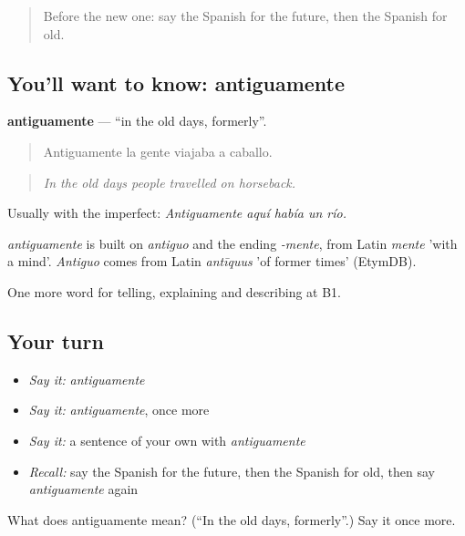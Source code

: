 \label{lesson:ES-C575-antiguamente}



\begin{quote}
Before the new one: say the Spanish for the future, then the Spanish for old.
\end{quote}

\subsection*{You'll want to know: antiguamente}
\textbf{antiguamente} — \textquotedblleft{}in the old days, formerly\textquotedblright{}.

\begin{quote}
Antiguamente la gente viajaba a caballo.
\end{quote}

\begin{quote}
\emph{In the old days people travelled on horseback.}
\end{quote}

Usually with the imperfect: \emph{Antiguamente aquí había un río.}

\begin{cousinweb}
\emph{antiguamente} is built on \emph{antiguo} and the ending \emph{-mente}, from Latin \emph{mente} 'with a mind'. \emph{Antiguo} comes from Latin \emph{antīquus} 'of former times' (EtymDB).
\end{cousinweb}

\begin{grammarlens}[title={What you've built}]
One more word for telling, explaining and describing at B1.
\end{grammarlens}

\subsection*{Your turn}
\begin{itemize}
\raggedright
  \item \emph{Say it:} \emph{antiguamente}
  \item \emph{Say it:} \emph{antiguamente}, once more
  \item \emph{Say it:} a sentence of your own with \emph{antiguamente}
  \item \emph{Recall:} say the Spanish for the future, then the Spanish for old, then say \emph{antiguamente} again
\end{itemize}

\begin{tcolorbox}[breakable,colback=teal!4,colframe=teal!35!black,title={Before you move on}]
What does antiguamente mean? (\textquotedblleft{}In the old days, formerly\textquotedblright{}.) Say it once more.
\end{tcolorbox}
